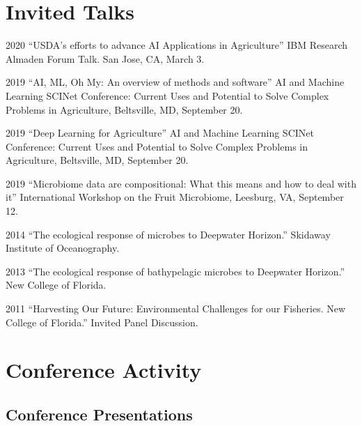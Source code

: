 \documentclass[12pt,letterpaper]{report}
\begin{document}
    \section*{Invited Talks}

    \begin{tablist}
    
    	\item[2020] \tab \enquote{USDA's efforts to advance AI Applications in Agriculture} IBM Research Almaden Forum Talk. San Jose, CA,  March 3.

        \item[2019] \tab \enquote{AI, ML, Oh My: An overview of methods and software}  AI and Machine Learning SCINet Conference:  Current Uses and Potential to Solve Complex Problems in Agriculture, Beltsville, MD, September 20.
        
        \item[2019] \tab \enquote{Deep Learning for Agriculture} AI and Machine Learning SCINet Conference:  Current Uses and Potential to Solve Complex Problems in Agriculture,  Beltsville, MD, September 20.
        
        \item[2019] \tab \enquote{Microbiome data are compositional: What this means and how to deal with it} International Workshop on the Fruit Microbiome,  Leesburg, VA, September 12.
        \item[2014] \tab \enquote{The ecological response of microbes to Deepwater Horizon.} Skidaway Institute of Oceanography. 
        \item[2013] \tab \enquote{The ecological response of bathypelagic microbes to Deepwater Horizon.} New College of Florida.
        \item[2011] \tab \enquote{Harvesting Our Future: Environmental Challenges for our Fisheries. New College of Florida.} Invited Panel Discussion.


        
       \end{tablist}

  
    \section*{Conference Activity}


    \subsection*{Conference Presentations}
\end{document}
